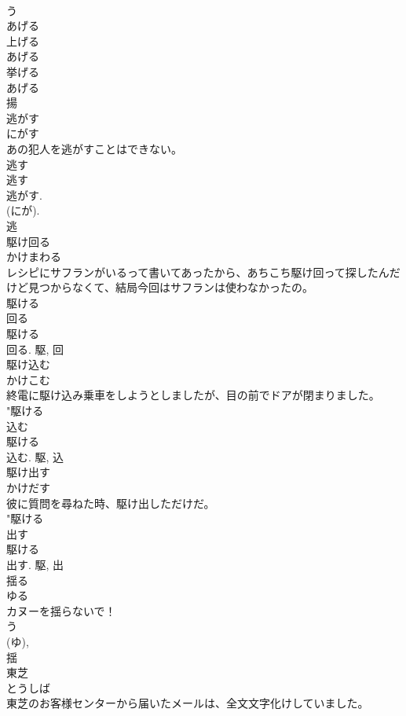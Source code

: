 \documentclass[8pt]{extreport}
\begin{document}
\begin{CJK}{UTF8}{min}
\\	う 
\\	あげる 
\\	上げる 
\\	あげる 
\\	挙げる 
\\	あげる 
\\	揚	
\\	逃がす	
\\	にがす	
\\	あの犯人を逃がすことはできない。	
\\	逃す 
\\	逃す 
\\	逃がす.	
\\	(にが). 
\\	逃	
\\	駆け回る	
\\	かけまわる	
\\	レシピにサフランがいるって書いてあったから、あちこち駆け回って探したんだけど見つからなくて、結局今回はサフランは使わなかったの。	
\\	駆ける 
\\	回る 
\\	駆ける 
\\	回る.	駆, 回	
\\	駆け込む	
\\	かけこむ	
\\	終電に駆け込み乗車をしようとしましたが、目の前でドアが閉まりました。	
\\	"駆ける 
\\	込む 
\\	駆ける 
\\	込む.	駆, 込	
\\	駆け出す	
\\	かけだす	
\\	彼に質問を尋ねた時、駆け出しただけだ。	
\\	"駆ける 
\\	出す 
\\	駆ける 
\\	出す.	駆, 出	
\\	揺る	
\\	ゆる	
\\	カヌーを揺らないで！	
\\	う 
\\	(ゆ), 
\\	揺	
\\	東芝	
\\	とうしば	
\\	東芝のお客様センターから届いたメールは、全文文字化けしていました。	

\end{CJK}
\end{document}
